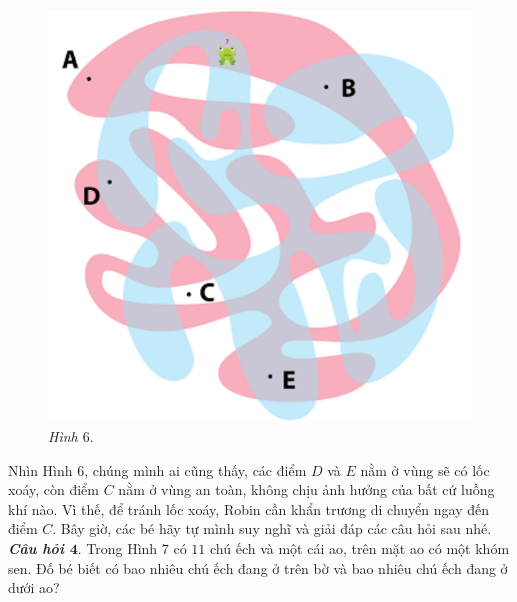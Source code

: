 \begin{multicols}{2}
\begin{figure}[H]
		\captionsetup{labelformat=empty, justification=centering}
		\includegraphics[width=1\linewidth]{6}
		\caption{\textit{\small Hình $6.$}}
		\vspace*{-10pt}
	\end{figure}
	Nhìn Hình $6$, chúng mình ai cũng thấy, các điểm $D$ và $E$ nằm ở vùng sẽ có lốc xoáy, còn điểm $C$ nằm ở vùng an toàn, không chịu ảnh hưởng của bất cứ luồng khí nào. Vì thế, để tránh lốc xoáy, Robin cần khẩn trương di chuyển ngay đến điểm $C$.
	\vskip 0.1cm
	Bây giờ, các bé hãy tự mình suy nghĩ và giải đáp các câu hỏi sau nhé.
	\vskip 0.1cm
	\textbf{\color{toancuabi}\textit{Câu hỏi $\pmb{4.}$}} Trong Hình $7$ có $11$ chú ếch và một cái ao, trên mặt ao có một khóm sen. Đố bé biết có bao nhiêu chú ếch đang ở trên bờ và bao nhiêu chú ếch đang ở dưới ao?
	\begin{figure}[H]
		\centering
		\vspace*{-5pt}
		\captionsetup{labelformat= empty, justification=centering}

\end{figure}
\end{multicols}
